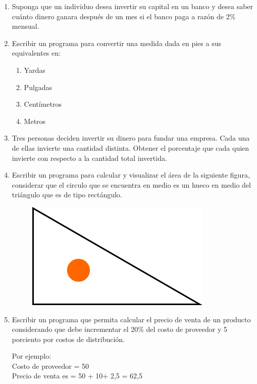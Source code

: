 \documentclass{scrartcl}
\begin{document}
\begin{enumerate}
		\item Suponga que un individuo desea invertir su capital en un banco y desea saber cuánto dinero ganara después de un mes si el banco paga a razón de 2\% mensual.
		
		\item Escribir un programa para convertir una medida dada en pies a sus equivalentes en:
		
			\begin{enumerate}
				\item Yardas
				\item Pulgadas
				\item Centímetros
				\item Metros
			\end{enumerate}

		\item Tres personas deciden invertir su dinero para fundar una empresa. Cada una de ellas invierte una cantidad distinta. Obtener el porcentaje que cada quien invierte con respecto a la cantidad total invertida.
		
		\item Escribir un programa para calcular y visualizar el área de la siguiente figura, considerar que el circulo que se encuentra en medio es un hueco en medio del triángulo que es de tipo rectángulo.
		
		\begin{figure}[ht]
			\centering
			\includegraphics[scale=0.5,angle=-45]{img/triangulo.png}
		\end{figure}
		
		\item Escribir un programa que permita calcular el precio de venta de un producto considerando que debe incrementar el 20\% del costo de proveedor y 5 porciento por costos de distribución. 
		
		Por ejemplo:\\
		Costo de proveedor = 50\\
		Precio de venta es = 50 + 10+ 2,5 = 62,5
		

\end{enumerate}
\end{document}

